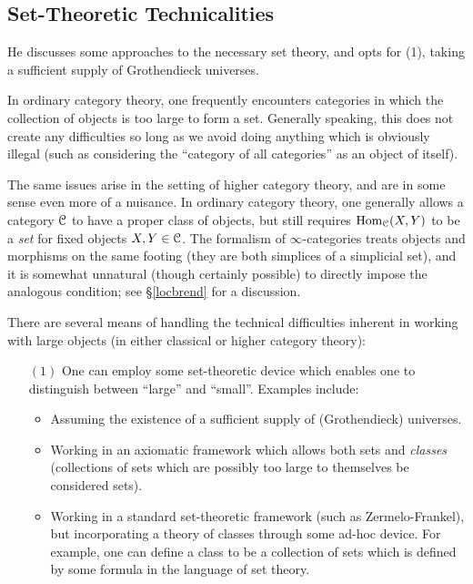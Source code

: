 \subsection{Set-Theoretic Technicalities}
\begin{1.2.15 Set-Theoretic Technicalities}
\begin{shaded}
He discusses some approaches to the necessary set theory, and opts for (1), taking a sufficient supply of Grothendieck universes.
\end{shaded}
In ordinary category theory, one frequently encounters categories in which the collection of objects
is too large to form a set. Generally speaking, this does not create
any difficulties so long as we avoid doing anything which is obviously illegal
(such as considering the ``category of all categories'' as an object of itself).

The same issues arise in the setting of higher category theory, and are
in some sense even more of a nuisance. In ordinary category
theory, one generally allows a category $\operatorname{\mathcal{C}}$ to have a proper
class of objects, but still requires $\operatorname{Hom}_{\operatorname{\mathcal{C}}}(X,Y)$ to be a
{\em set} for fixed objects $X,Y \in \operatorname{\mathcal{C}}$. The formalism of $\infty$-categories treats
objects and morphisms on the same footing (they are both simplices of a simplicial set), and it is somewhat unnatural (though certainly possible) to directly impose the analogous condition; see \S \ref{locbrend} for a discussion.

There are several means of handling the technical difficulties
inherent in working with large objects (in either classical or higher category theory):

\begin{itemize}
\item[$(1)$] One can employ some set-theoretic device which enables one
to distinguish between ``large'' and ``small''. Examples include:
\begin{itemize}
\item Assuming the existence of a sufficient supply of
(Grothendieck) universes.

\item Working in an axiomatic framework which allows both sets and
{\it classes} (collections of sets which are possibly too large to
themselves be considered sets).

\item Working in a standard set-theoretic framework (such as
Zermelo-Frankel), but incorporating a theory of classes through
some ad-hoc device. For example, one can define a class to be a
collection of sets which is defined by some formula in the
language of set theory.
\end{itemize}


\end{itemize}
\end{1.2.15 Set-Theoretic Technicalities}
